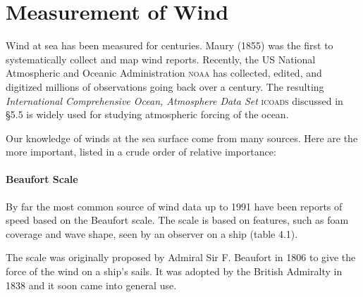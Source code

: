 \section{Measurement of Wind}
Wind at sea has been measured for centuries. Maury (1855)
was the first to systematically collect and map wind reports. Recently, the US
National Atmospheric and Oceanic Administration
\textsc{noaa} has collected, edited, and digitized millions of observations going back
over a century. The resulting
\textit{International Comprehensive Ocean, Atmosphere Data Set} \textsc{icoads} discussed in \S 5.5 is widely used for
studying atmospheric forcing of the ocean.

Our knowledge of winds at the sea surface come from many sources. Here are the more
important, listed in a crude order of relative importance:

\paragraph{Beaufort Scale}
By far the most common source of wind data up to 1991 have been
reports of speed based on the Beaufort scale. The scale is based on features,
such as foam coverage and wave shape, seen by an observer on a ship (table 4.1).

The scale was originally proposed by Admiral Sir F. Beaufort in 1806 to give the
force of the wind on a ship's sails. It was adopted by the British Admiralty in
1838 and it soon came into general use.

